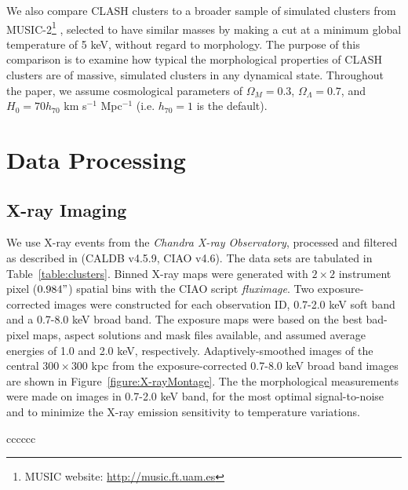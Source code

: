 \documentclass[iop,twocolumn]{emulateapj}
\begin{document}
{We also compare CLASH clusters to a broader sample of simulated clusters from MUSIC-2\footnote{MUSIC website: \url{http://music.ft.uam.es}}
 \citep{sembolini.etal.2013}, selected to have similar masses by making a cut at a minimum global temperature of 5 keV, without regard to 
 morphology.
The purpose of this comparison is to examine how typical the morphological properties of CLASH clusters are of massive, simulated clusters in any dynamical state.
Throughout the paper, we assume cosmological parameters of $\Omega_M=0.3$, $\Omega_\Lambda=0.7$, and $H_0=70 h_{70}$ km s$^{-1}$ Mpc$^{-1}$ (i.e. $h_{70}=1$ is the default).

\section{Data Processing}

\subsection{X-ray Imaging}

We use X-ray events from the {\em Chandra X-ray Observatory}, processed and filtered as described in \citealt{2014ApJ...794..136D} (CALDB v4.5.9, CIAO v4.6). 
The data sets are tabulated in Table~\ref{table:clusters}.
Binned X-ray maps were generated with $2 \times 2$ instrument pixel  ($0.984"$) spatial bins with the CIAO script {\em fluximage}. 
Two exposure-corrected images were constructed for each observation ID,
0.7-2.0 keV soft band and a 0.7-8.0 keV broad band. The exposure maps were based on the best bad-pixel maps, aspect solutions
and mask files available, and assumed average energies of 1.0 and 2.0 keV, respectively. Adaptively-smoothed images of the
central $300 \times 300$ kpc from the exposure-corrected 0.7-8.0
keV broad band images are shown in Figure~\ref{figure:X-rayMontage}. The the morphological measurements
were made on images in 0.7-2.0 keV band,  for the most optimal signal-to-noise and to 
minimize the X-ray emission sensitivity to temperature variations.



\begin{deluxetable*}{cccccc}





\end{deluxetable*}}
\end{document}
